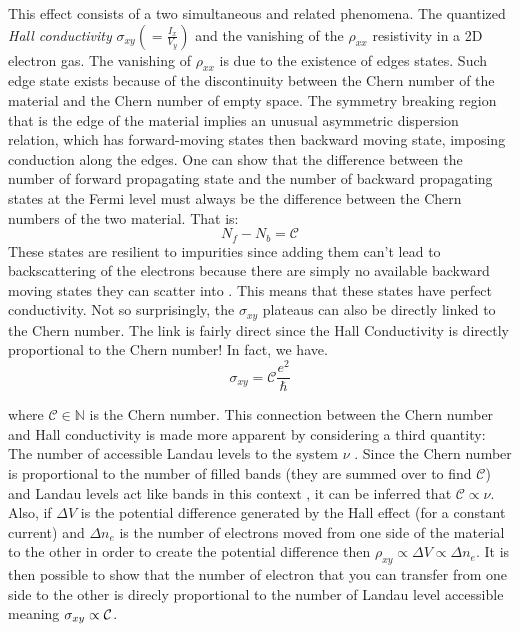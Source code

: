 This effect consists of a two simultaneous and related phenomena. The quantized \textit{Hall conductivity} $\sigma_{xy}(=\frac{I_x}{V_y})$ and the vanishing of the $\rho_{xx}$ resistivity in a 2D electron gas. The vanishing of $\rho_{xx}$ is due to the existence of edges states.%
Such edge state exists because of the discontinuity between the Chern number of the material and the Chern number of empty space. The symmetry breaking region that is the edge of the material implies an unusual asymmetric dispersion relation, which has forward-moving states then backward moving state, imposing conduction along the edges. One can show that the difference between the number of forward  propagating state and the number of backward propagating states at the Fermi level must always be the difference between the Chern numbers of the two material\cite{kane_topological_2013}. That is: $$N_f -N_b = \mathcal{C}$$ These states are resilient to impurities since adding them can't lead to backscattering of the electrons because there are simply no available backward moving states they can scatter into \cite{qi_quantum_2010}. This means that these states have perfect conductivity. Not so surprisingly, the $\sigma_{xy}$ plateaus can also be directly linked to the Chern number. The link is fairly direct since the Hall Conductivity is directly proportional to the Chern number! In fact, we have.
\begin{equation}
\sigma_{xy} = \mathcal{C}\frac{e^2}{\hbar}
\end{equation}

where $\mathcal{C} \in \mathbb{N}$ is the Chern number. This connection between the Chern number and Hall conductivity is made more apparent by considering a third quantity: The number of accessible Landau levels to the system $\nu$ . Since the Chern number is proportional to the number of filled bands (they are summed over to find $\mathcal{C}$) and Landau levels act like bands in this context \cite{kane_topological_2013}, it can be inferred that $\mathcal{C}\propto \nu$. Also, if $\Delta V$ is the potential difference generated by the Hall effect (for a constant current) and $\Delta n_e$ is the number of electrons moved from one side of the material to the other in order to create the potential difference then $\rho_{xy} \propto \Delta V \propto \Delta n_e$. It is then possible to show that the number of electron that you can transfer from one side to the other is direcly proportional to the number of Landau level accessible meaning $\sigma_{xy} \propto \cal{C}$. 

